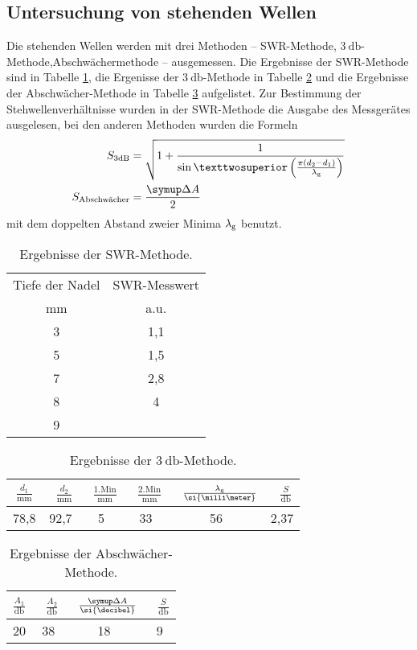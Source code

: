 \subsection{Untersuchung von stehenden Wellen}
\label{sec:Auswertung_SWR}
Die stehenden Wellen werden mit drei Methoden -- SWR-Methode, $\SI{3}{\decibel}$-Methode,Abschwächermethode -- ausgemessen. 
Die Ergebnisse der SWR-Methode sind in Tabelle \ref{tab:swr_methode}, die Ergenisse der $\SI{3}{\decibel}$-Methode in Tabelle \ref{tab:3dB} und die Ergebnisse der Abschwächer-Methode in Tabelle \ref{tab:Abschwaecher} aufgelistet.
Zur Bestimmung der Stehwellenverhältnisse wurden in der SWR-Methode die Ausgabe des Messgerätes ausgelesen, bei den anderen Methoden wurden die Formeln
\begin{align}
	S_\text{3dB}&=\sqrt{1+\frac{1}{\sin²\left(\frac{\pi(d_2-d_1)}{\lambda_\text g}\right)}}\\
	S_\text{Abschwächer}&=\frac{\symup\Delta A}{2}
\end{align}
mit dem doppelten Abstand zweier Minima $\lambda_\text g$ benutzt.
\begin{table}
\centering
\caption{Ergebnisse der SWR-Methode.}
\begin{tabular}{cc}
	\toprule
	Tiefe der Nadel& SWR-Messwert\\
	\si{\milli\meter}& a.u.\\
	\midrule
	3& 1,1\\
	5& 1,5\\
	7& 2,8\\
	8& 4\\
	9& \infty \\
	\bottomrule
\end{tabular}
\label{tab:swr_methode}
\end{table}
\begin{table}
\centering
\caption{Ergebnisse der $\SI{3}{\decibel}$-Methode.}
\begin{tabular}{cccccc}
	\toprule
	$\frac{d_1}{\si{\milli\meter}}$& \
	$\frac{d_2}{\si{\milli\meter}}$& \
	$\frac{\text{1.Min}}{\si{\milli\meter}}$& \
	$\frac{\text{2.Min}}{\si{\milli\meter}}$& \
	$\frac{\lambda_\text g}{\si{\milli\meter}}$& \
	$\frac{S}{\si{\decibel}}$\\
	\midrule
	78,8&	92,7&	5&	33& 56&	2,37\\
	\bottomrule
\end{tabular}
\label{tab:3dB}
\end{table}
\begin{table}
\centering
\caption{Ergebnisse der Abschwächer-Methode.}
\begin{tabular}{cccc}
	\toprule
	$\frac{A_1}{\si{\decibel}}$& \
	$\frac{A_2}{\si{\decibel}}$& \	
	$\frac{\symup\Delta A}{\si{\decibel}}$& \	
	$\frac{S}{\si{\decibel}}$\\
	\midrule
	20&	38&	18&	9\\
	\bottomrule
\end{tabular}
\label{tab:Abschwaecher}
\end{table}